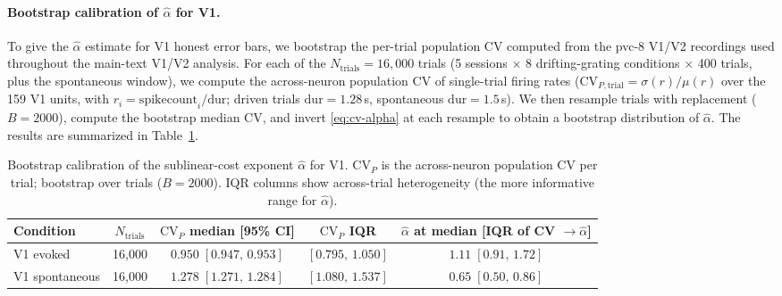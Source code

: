 \documentclass[11pt]{article}
\theoremstyle{remark}
\theoremstyle{definition}
\begin{document}
\paragraph{Bootstrap calibration of $\hat\alpha$ for V1.}
\label{sec:alpha-bootstrap}
To give the $\hat\alpha$ estimate for V1 honest error bars, we bootstrap the per-trial population CV computed from the pvc-8 V1/V2 recordings used throughout the main-text V1/V2 analysis.  For each of the $N_{\mathrm{trials}}=16{,}000$ trials (5 sessions $\times$ 8 drifting-grating conditions $\times$ 400 trials, plus the spontaneous window), we compute the across-neuron population CV of single-trial firing rates ($\mathrm{CV}_{P,\mathrm{trial}} = \sigma(r)/\mu(r)$ over the 159 V1 units, with $r_i=\mathrm{spikecount}_i/\mathrm{dur}$; driven trials $\mathrm{dur}=1.28$\,s, spontaneous $\mathrm{dur}=1.5$\,s).  We then resample trials with replacement ($B=2000$), compute the bootstrap median CV, and invert \eqref{eq:cv-alpha} at each resample to obtain a bootstrap distribution of $\hat\alpha$.  The results are summarized in Table~\ref{tab:alpha-bootstrap}.

\begin{table}[h!]
\centering
\caption{Bootstrap calibration of the sublinear-cost exponent $\hat\alpha$ for V1.  $\mathrm{CV}_P$ is the across-neuron population CV per trial; bootstrap over trials ($B=2000$).  IQR columns show across-trial heterogeneity (the more informative range for $\hat\alpha$).}
\label{tab:alpha-bootstrap}
\begin{tabular}{lcccc}
\toprule
Condition & $N_{\mathrm{trials}}$ & $\mathrm{CV}_P$ median [95\% CI] & $\mathrm{CV}_P$ IQR & $\hat\alpha$ at median [IQR of CV $\to\hat\alpha$] \\
\midrule
V1 evoked      & 16{,}000 & $0.950\;[0.947,\,0.953]$ & $[0.795,\,1.050]$ & $1.11\;[0.91,\,1.72]$ \\
V1 spontaneous & 16{,}000 & $1.278\;[1.271,\,1.284]$ & $[1.080,\,1.537]$ & $0.65\;[0.50,\,0.86]$ \\
\bottomrule
\end{tabular}
\end{table}
\end{document}
